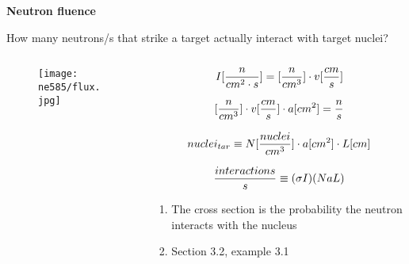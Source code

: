 \documentclass[aspectratio=1610,pdftex,dvipsnames,compress,xcolor={dvipsnames}]{beamer}
\begin{document}
\begin{frame}[plain]{}
    \centering\LARGE\textbf{Neutron fluence}
\end{frame}


\addtocounter{framenumber}{-1} 
\begin{frame}{How many neutrons/s that strike a target actually interact with target nuclei?}
    \begin{columns}[t]

        \begin{column}{0.55\textwidth}
            \begin{figure}
                \centering
                \texttt{[image: ne585/flux.jpg]}
            \end{figure}
        \end{column}

        \begin{column}{0.45\textwidth}
            \begin{equation}
                \small
                I[\frac{n}{cm^2 \cdot s}]=[\frac{n}{cm^3}] \cdot v[\frac{cm}{s}]
            \end{equation}

            \begin{equation}
                \small
                [\frac{n}{cm^3}] \cdot v[\frac{cm}{s}] \cdot a[cm^2]=\frac{n}{s}
            \end{equation}

            \begin{equation}
                \small
                nuclei_{tar} \equiv N[\frac{nuclei}{cm^3}] \cdot a[cm^2] \cdot L[cm]
            \end{equation}

            \begin{equation}
                \small
                \frac{interactions}{s} \equiv (\sigma I)(NaL)
            \end{equation}

            \vspace*{\fill}

            \begin{enumerate}[series=outerlist,topsep=0pt,itemsep=7pt,leftmargin=*,label=(\arabic*)]
                \item[]\small The cross section is the probability the neutron interacts with the nucleus
                \item[]\small Section 3.2, example 3.1 
            \end{enumerate}
        \end{column}

    \end{columns}
\end{frame}
\end{document}
